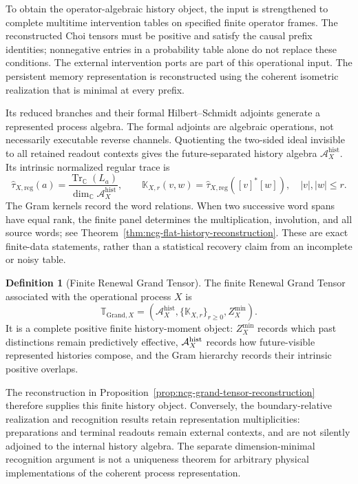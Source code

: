 \documentclass[11pt]{article}
\theoremstyle{definition}
\newtheorem{definition}[definition]{Definition}
\theoremstyle{remark}
\theoremstyle{definition}
\theoremstyle{remark}
\newcommand{\C}{\mathbb C}
\newcommand{\A}{\mathcal A}
\newcommand{\GTX}{\boldsymbol{\mathbb T}_{\mathrm{Grand},X}}
\begin{document}
To obtain the operator-algebraic history object, the input is strengthened to
complete multitime intervention tables on specified finite operator frames.
The reconstructed Choi tensors must be positive and satisfy the causal prefix
identities; nonnegative entries in a probability table alone do not replace
these conditions.  The external intervention ports are part of this operational
input.  The persistent memory representation is reconstructed using the coherent
isometric realization that is minimal at every prefix.

Its reduced branches and their formal Hilbert--Schmidt adjoints generate a
represented process algebra.  The formal adjoints are algebraic operations,
not necessarily executable reverse channels.  Quotienting the two-sided ideal
invisible to all retained readout contexts gives the future-separated history
algebra $\A_X^{\mathrm{hist}}$.  Its intrinsic normalized regular trace is
\begin{equation}
 \widehat\tau_{X,\mathrm{reg}}(a)
 =\frac{\operatorname{Tr}_{\C}(L_a)}{\dim_{\C}\A_X^{\mathrm{hist}}},
 \qquad
 \mathbb K_{X,r}(v,w)
 =\widehat\tau_{X,\mathrm{reg}}([v]^*[w]),\quad |v|,|w|\le r.
 \label{eq:overview-history-gram}
\end{equation}
The Gram kernels record the word relations.  When two successive word spans
have equal rank, the finite panel determines the multiplication, involution,
and all source words; see Theorem~\ref{thm:ncg-flat-history-reconstruction}.
These are exact finite-data statements, rather than a statistical recovery
claim from an incomplete or noisy table.

\begin{definition}[Finite Renewal Grand Tensor]
\label{def:ncg-grand-tensor}
The finite Renewal Grand Tensor associated with the operational process $X$ is
\begin{equation}
 \boxed{
 \GTX
 =\left(
 \A_X^{\mathrm{hist}},
 \{\mathbb K_{X,r}\}_{r\ge0},
 Z_X^{\min}
 \right).}
\label{eq:ncg-grand-tensor}
\end{equation}
It is a complete positive finite history-moment object: $Z_X^{\min}$ records
which past distinctions remain predictively effective, $\A_X^{\rm hist}$ records
how future-visible represented histories compose, and the Gram hierarchy records
their intrinsic positive overlaps.
\end{definition}

The reconstruction in Proposition~\ref{prop:ncg-grand-tensor-reconstruction}
therefore supplies this finite history object.  Conversely, the boundary-relative
realization and recognition results retain representation multiplicities:
preparations and terminal readouts remain external contexts, and are not silently
adjoined to the internal history algebra.  The separate dimension-minimal
recognition argument is not a uniqueness theorem for arbitrary physical
implementations of the coherent process representation.
\end{document}
